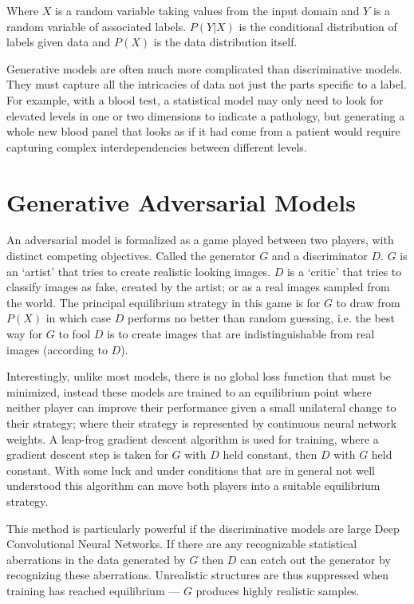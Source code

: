 \documentclass[a4paper,12pt]{spieman}  %
\begin{document}
\begin{spacing}{1}
	\noindent Where $X$ is a random variable taking values from the input
	domain and $Y$ is a random variable of associated labels. $P(Y|X)$ is
	the conditional distribution of labels given data and $P(X)$ is the
	data distribution itself.

	Generative models are often much more complicated than discriminative
	models. They must capture all the intricacies of data not just the
	parts specific to a label. For example, with a blood test, a
	statistical model may only need to look for elevated levels in one or
	two dimensions to indicate a pathology, but generating a whole new
	blood panel that looks as if it had come from a patient would require
	capturing complex interdependencies between different levels.


\section{Generative Adversarial Models}

	An adversarial model is formalized as a game played between two
	players, with distinct competing objectives. Called the generator $G$
	and a discriminator $D$. $G$ is an `artist' that tries to create
	realistic looking images. $D$ is a `critic' that tries to classify
	images as fake, created by the artist; or as a real images sampled from
	the world. The principal equilibrium strategy in this game is for $G$
	to draw from $P(X)$ in which case $D$ performs no better than random
	guessing, i.e. the best way for $G$ to fool $D$ is to create images
	that are indistinguishable from real images (according to $D$).

	Interestingly, unlike most models, there is no global loss function that
	must be minimized, instead these models are trained to an equilibrium
	point where neither player can improve their performance given a small
	unilateral change to their strategy; where their strategy is
	represented by continuous neural network weights. A leap-frog gradient
	descent algorithm is used for training, where a gradient descent step
	is taken for $G$ with $D$ held constant, then $D$ with $G$ held
	constant.  With some luck and under conditions that are in general not
	well understood this algorithm can move both players into a suitable
	equilibrium strategy.
	
	This method is particularly powerful if the discriminative models are
	large Deep Convolutional Neural Networks. If there are any recognizable
	statistical aberrations in the data generated by $G$ then $D$ can
	catch out the generator by recognizing these aberrations. Unrealistic
	structures are thus suppressed when training has reached equilibrium
	--- $G$ produces highly realistic samples.


\end{spacing}
\end{document}
